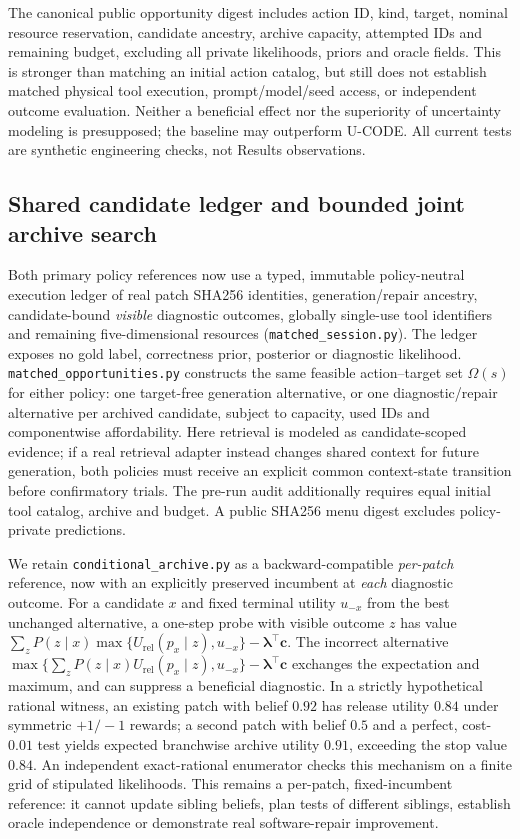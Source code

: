 \documentclass[pdflatex,sn-basic]{sn-jnl}
\begin{document}
The canonical public opportunity digest includes action ID,
kind, target, nominal resource reservation, candidate ancestry,
archive capacity, attempted IDs and remaining budget, excluding
all private likelihoods, priors and oracle fields. This is stronger
than matching an initial action catalog, but still does not
establish matched physical tool execution, prompt/model/seed
access, or independent outcome evaluation. Neither a beneficial
effect nor the superiority of uncertainty modeling is
presupposed; the baseline may outperform U-CODE. All current
tests are synthetic engineering checks, not Results observations.

\subsection{Shared candidate ledger and bounded joint archive search}
\label{sec:shared-archive}

Both primary policy references now use a typed, immutable
policy-neutral execution ledger of real patch SHA256 identities,
generation/repair ancestry, candidate-bound \emph{visible}
diagnostic outcomes, globally single-use tool identifiers and
remaining five-dimensional resources
(\texttt{matched\_session.py}). The ledger exposes no gold label,
correctness prior, posterior or diagnostic likelihood.
\texttt{matched\_opportunities.py} constructs the same feasible
action--target set $\Omega(s)$ for either policy: one target-free
generation alternative, or one diagnostic/repair alternative
per archived candidate, subject to capacity, used IDs and
componentwise affordability. Here retrieval is modeled as
candidate-scoped evidence; if a real retrieval adapter instead changes
shared context for future generation, both policies must receive an
explicit common context-state transition before confirmatory trials.
The pre-run audit additionally
requires equal initial tool catalog, archive and budget.
A public SHA256 menu digest excludes policy-private predictions.

We retain \texttt{conditional\_archive.py} as a backward-compatible
\emph{per-patch} reference, now with an explicitly preserved
incumbent at \emph{each} diagnostic outcome. For a candidate $x$
and fixed terminal utility $u_{-x}$ from the best unchanged
alternative, a one-step probe with visible outcome $z$ has value
$\sum_z P(z\mid x)\max\{U_{\mathrm{rel}}(p_x\mid z),u_{-x}\}
-\boldsymbol\lambda^\top\mathbf c$.
The incorrect alternative
$\max\{\sum_zP(z\mid x)U_{\mathrm{rel}}(p_x\mid z),u_{-x}\}
-\boldsymbol\lambda^\top\mathbf c$ exchanges the expectation and
maximum, and can suppress a beneficial diagnostic.
In a strictly hypothetical rational witness, an existing patch
with belief $0.92$ has release utility $0.84$ under symmetric
$+1/-1$ rewards; a second patch with belief $0.5$ and a
perfect, cost-$0.01$ test yields expected branchwise archive
utility $0.91$, exceeding the stop value $0.84$.
An independent exact-rational enumerator checks this mechanism
on a finite grid of stipulated likelihoods. This remains a
per-patch, fixed-incumbent reference: it cannot update sibling
beliefs, plan tests of different siblings, establish oracle
independence or demonstrate real software-repair improvement.
\end{document}
